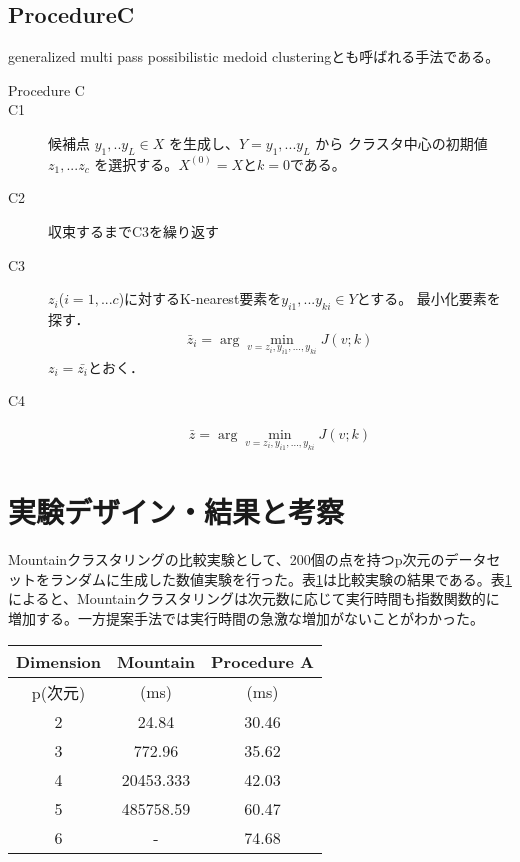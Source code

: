 \documentclass[10pt,onecolumn]{jsarticle}
\begin{document}
\subsection{ProcedureC}
generalized multi pass possibilistic medoid clusteringとも呼ばれる手法である。
\begin{description}
	\item[Procedure C]
	\item[C1]候補点 $y_1,.. y_L \in X$ を生成し、$Y= {y_1,... y_L}$ から クラスタ中心の初期値$z_1,... z_c$ を選択する。$X^{(0)}= Xとk = 0$である。
	\item[C2]収束するまでC3を繰り返す
	\item[C3]$z_i$($i= 1,... c$)に対するK-nearest要素を$y_{i1},... y_{ki}\in Y$とする。
	最小化要素を探す．
	\begin{align}
		\bar{z}_{i}=\arg \min _{v=z_{i}, y_{i 1}, \ldots, y_{k i}} J(v ; k)
	\end{align}
	$z_i=\bar{z_i}$とおく．
	\item[C4]
	\begin{align}
		\bar{z}=\arg \min _{v=z_{i}, y_{i 1}, \ldots, y_{k i}} J(v ; k)
	\end{align}
\end{description}


\section{実験デザイン・結果と考察}
Mountainクラスタリングの比較実験として、200個の点を持つp次元のデータセットをランダムに生成した数値実験を行った。表\ref{comparison_experiment}は比較実験の結果である。表\ref{comparison_experiment}によると、Mountainクラスタリングは次元数に応じて実行時間も指数関数的に増加する。一方提案手法では実行時間の急激な増加がないことがわかった。
\begin{table}[h]
\label{comparison_experiment}
\centering
\begin{tabular}{|c|c|c|}
\hline
\multicolumn{1}{|l|}{Dimension} & \multicolumn{1}{l|}{Mountain} & \multicolumn{1}{l|}{Procedure A} \\ \hline
p(次元)                           & (ms)                          & (ms)                            \\ \hline
2                               & 24.84                         & 30.46                           \\ \hline
3                               & 772.96                        & 35.62                           \\ \hline
4                               & 20453.333                     & 42.03                           \\ \hline
5                               & 485758.59                     & 60.47                           \\ \hline
6                               & -                             & 74.68                           \\ \hline
\end{tabular}
\end{table}
\end{document}
